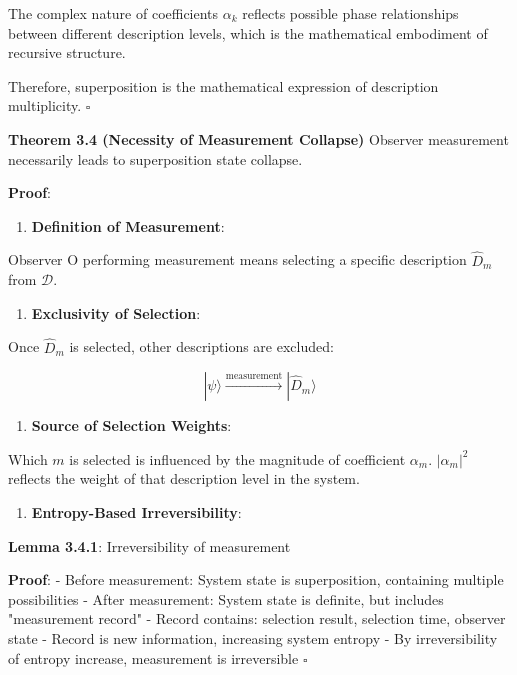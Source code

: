    The complex nature of coefficients $\alpha_k$ reflects possible phase relationships between different description levels, which is the mathematical embodiment of recursive structure.

Therefore, superposition is the mathematical expression of description multiplicity. $\square$

\textbf{Theorem 3.4 (Necessity of Measurement Collapse)}
\label{thm:3.4}
Observer measurement necessarily leads to superposition state collapse.

\textbf{Proof}:

\begin{enumerate}
\item \textbf{Definition of Measurement}:
\end{enumerate}
   Observer O performing measurement means selecting a specific description $\hat{D}_m$ from $\mathcal{D}$.
   
\begin{enumerate}
\item \textbf{Exclusivity of Selection}:
\end{enumerate}
   Once $\hat{D}_m$ is selected, other descriptions are excluded:
   
\begin{equation}
|\psi\rangle \xrightarrow{\text{measurement}} |\hat{D}_m\rangle
\end{equation}

\begin{enumerate}
\item \textbf{Source of Selection Weights}:
\end{enumerate}
   Which $m$ is selected is influenced by the magnitude of coefficient $\alpha_m$.
   $|\alpha_m|^2$ reflects the weight of that description level in the system.
   
\begin{enumerate}
\item \textbf{Entropy-Based Irreversibility}:
\end{enumerate}
   \textbf{Lemma 3.4.1}: Irreversibility of measurement
\label{lemma:3.4.1}
   
   \textbf{Proof}:
   - Before measurement: System state is superposition, containing multiple possibilities
   - After measurement: System state is definite, but includes "measurement record"
   - Record contains: selection result, selection time, observer state
   - Record is new information, increasing system entropy
   - By irreversibility of entropy increase, measurement is irreversible $\square$


